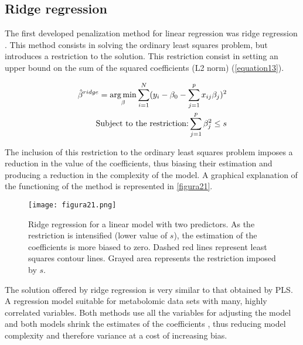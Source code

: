\subsection{Ridge regression}
The first developed penalization method for linear regression was ridge regression \parencite{hoerl1970ridge}. This method consists in solving the ordinary least squares problem, but introduces a restriction to the solution. This restriction consist in setting an upper bound on the sum of the squared coefficients (L2 norm) (\autoref{equation13}).

\begin{equation}
\label{equation13}
\begin{split}
\hat{\beta}^{ridge}=\operatorname*{arg\,min}_\beta \sum\limits_{i=1}^N (y_{i}-\beta_{0}-\sum\limits_{j=1}^p x_{ij}\beta_{j})^{2} \\
\textrm{Subject to the restriction:}  \sum\limits_{j=1}^p \beta_{j}^2\leq s
\end{split}
\end{equation}

The inclusion of this restriction to the ordinary least squares problem imposes a reduction in the value of the coefficients, thus biasing their estimation and producing a reduction in the complexity of the model. A graphical explanation of the functioning of the method is represented in \autoref{figura21}.

\begin{figure}[hbtp]
\centering
\texttt{[image: figura21.png]}
\caption{Ridge regression for a linear model with two predictors. As the restriction is intensified (lower value of $s$), the estimation of the coefficients is more biased to zero. Dashed red lines represent least squares contour lines. Grayed area represents the restriction imposed by $s$.}
\label{figura21}
\end{figure}

The solution offered by ridge regression is very similar to that obtained by PLS. A regression model suitable for metabolomic data sets with many, highly correlated variables. Both methods use all the variables for adjusting the model and both models shrink the estimates of the coefficients \parencite{de1995pls}, thus reducing model complexity and therefore variance at a cost of increasing bias.


